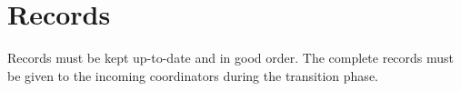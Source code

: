 \chapter{Records}\label{sec:records}
Records must be kept up-to-date and in good order. The complete records must be given to the incoming coordinators during the transition phase.
